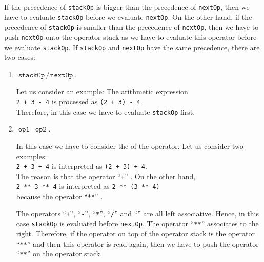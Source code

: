 If the precedence of \texttt{stackOp} is bigger than the precedence of \texttt{nextOp}, then we have
to evaluate \texttt{stackOp} before we evaluate \texttt{nextOp}.  On the other hand, if the precedence
of \texttt{stackOp} is smaller than the precedence of \texttt{nextOp}, then we have to push
\texttt{nextOp} onto the operator stack as we have to evaluate this operator before we evaluate \texttt{stackOp}.
If \texttt{stackOp} and \texttt{nextOp} have the same precedence, there are two cases:
\begin{enumerate}
\item $\texttt{stackOp} \not= \texttt{nextOp}$.

      Let us consider an example:  The arithmetic expression 
      \\[0.2cm]
      \hspace*{1.3cm} 
      \texttt{2 + 3 - 4} \quad is processed as \quad \texttt{(2 + 3) - 4}. 
      \\[0.2cm]
      Therefore, in this case we have to evaluate \texttt{stackOp} first.
\item $\texttt{op1} = \texttt{op2}$.

      In this case we have to consider the  of the operator.
      Let us consider two examples: \\[0.2cm]
      \hspace*{1.3cm} \texttt{2 + 3 + 4} \quad is interpreted as \quad \texttt{(2 + 3) + 4}. \\[0.2cm]
      The reason is that the operator ``\texttt{+}'' .
      On the other hand, \\[0.2cm]
      \hspace*{1.3cm} 
      \texttt{2 \texttt{**} 3 \texttt{**} 4}  \quad is interpreted as \quad \texttt{2 \texttt{**} (3 \texttt{**} 4)}
      \\[0.2cm]
      because the operator ``\texttt{**}'' .

      The operators ``\texttt{+}'', ``\texttt{-}'', ``\texttt{*}'', ``\texttt{/}'' and 
      ``\texttt{}'' are all left associative.  Hence, in this case \texttt{stackOp} is
      evaluated before \texttt{nextOp}.
      The operator ``\texttt{**}'' associates to the right. Therefore, if
      the operator on top of the operator stack is the operator ``\texttt{**}'' and then this operator
      is read again, then we have to push the  operator ``\texttt{**}'' on the operator stack.
\end{enumerate}
